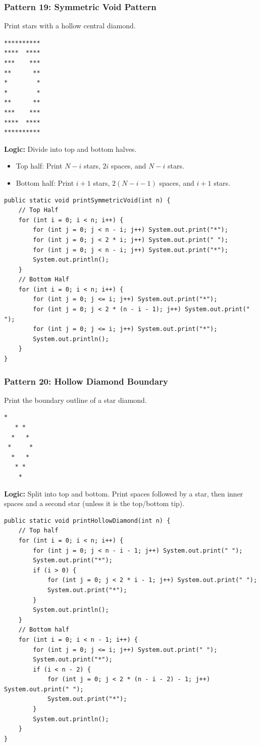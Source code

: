 \documentclass[12pt,a4paper,oneside]{book}
\begin{document}
\subsubsection{Pattern 19: Symmetric Void Pattern}
Print stars with a hollow central diamond.
\begin{lstlisting}[frame=single]
**********
****  ****
***    ***
**      **
*        *
*        *
**      **
***    ***
****  ****
**********
\end{lstlisting}
\textbf{Logic:} Divide into top and bottom halves. 
\begin{itemize}
    \item Top half: Print $N-i$ stars, $2i$ spaces, and $N-i$ stars.
    \item Bottom half: Print $i+1$ stars, $2(N-i-1)$ spaces, and $i+1$ stars.
\end{itemize}
\begin{lstlisting}[caption={Symmetric Void Pattern}]
public static void printSymmetricVoid(int n) {
    // Top Half
    for (int i = 0; i < n; i++) {
        for (int j = 0; j < n - i; j++) System.out.print("*");
        for (int j = 0; j < 2 * i; j++) System.out.print(" ");
        for (int j = 0; j < n - i; j++) System.out.print("*");
        System.out.println();
    }
    // Bottom Half
    for (int i = 0; i < n; i++) {
        for (int j = 0; j <= i; j++) System.out.print("*");
        for (int j = 0; j < 2 * (n - i - 1); j++) System.out.print(" ");
        for (int j = 0; j <= i; j++) System.out.print("*");
        System.out.println();
    }
}
\end{lstlisting}

\subsubsection{Pattern 20: Hollow Diamond Boundary}
Print the boundary outline of a star diamond.
\begin{lstlisting}[frame=single]
    *
   * *
  *   *
 *     *
  *   *
   * *
    *
\end{lstlisting}
\textbf{Logic:} Split into top and bottom. Print spaces followed by a star, then inner spaces and a second star (unless it is the top/bottom tip).
\begin{lstlisting}[caption={Hollow Diamond Boundary}]
public static void printHollowDiamond(int n) {
    // Top half
    for (int i = 0; i < n; i++) {
        for (int j = 0; j < n - i - 1; j++) System.out.print(" ");
        System.out.print("*");
        if (i > 0) {
            for (int j = 0; j < 2 * i - 1; j++) System.out.print(" ");
            System.out.print("*");
        }
        System.out.println();
    }
    // Bottom half
    for (int i = 0; i < n - 1; i++) {
        for (int j = 0; j <= i; j++) System.out.print(" ");
        System.out.print("*");
        if (i < n - 2) {
            for (int j = 0; j < 2 * (n - i - 2) - 1; j++) System.out.print(" ");
            System.out.print("*");
        }
        System.out.println();
    }
}
\end{lstlisting}
\end{document}
